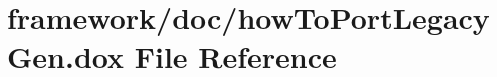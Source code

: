 \hypertarget{how_to_port_legacy_gen_8dox}{}\section{framework/doc/how\+To\+Port\+Legacy\+Gen.dox File Reference}
\label{how_to_port_legacy_gen_8dox}
